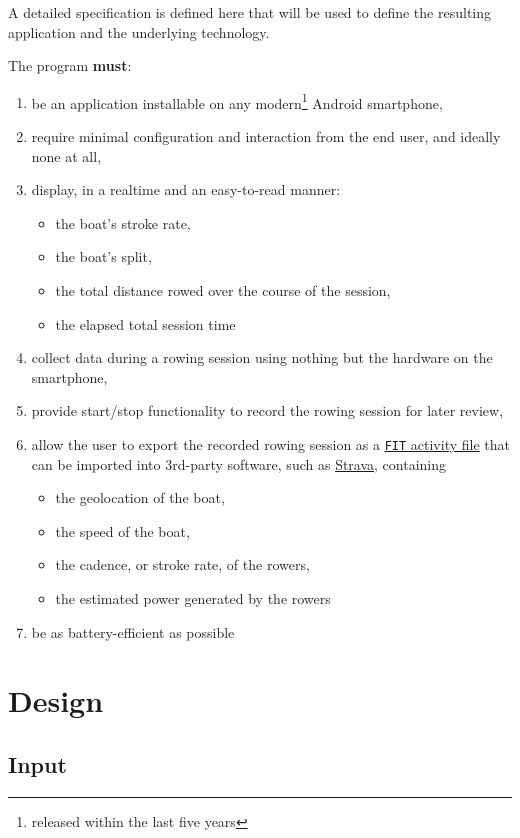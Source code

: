 \documentclass[11pt,twoside,a4paper]{report}
\begin{document}
A detailed specification is defined here that will be used to define the resulting application and the underlying technology.

The program \textbf{must}:
\begin{enumerate}
  \item be an application installable on any modern\footnote{released within the last five years} Android smartphone,
  \item require minimal configuration and interaction from the end user, and ideally none at all,
  \item display, in a realtime and an easy-to-read manner:
  \begin{itemize}
    \item the boat's stroke rate,
    \item the boat's split,
    \item the total distance rowed over the course of the session,
    \item the elapsed total session time
  \end{itemize}
  \item collect data during a rowing session using nothing but the hardware on the smartphone,
  \item provide start/stop functionality to record the rowing session for later review,
  \item allow the user to export the recorded rowing session as a \href{https://developer.garmin.com/fit/file-types/activity/}{\texttt{FIT} activity file} that can be imported into 3rd-party software, such as \href{https://strava.com}{Strava}, containing
  \begin{itemize}
    \item the geolocation of the boat,
    \item the speed of the boat,
    \item the cadence, or stroke rate, of the rowers,
    \item the estimated power generated by the rowers
  \end{itemize}
  \item be as battery-efficient as possible
\end{enumerate}

\chapter{Design}

\section{Input}
\end{document}
